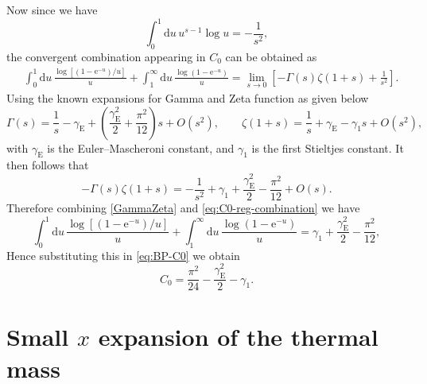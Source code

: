 \documentclass[a4paper,11pt]{article}
\newcommand{\e}{\mathrm e}
\newcommand{\dd}{\mathrm d}
\begin{document}
Now since we have
\begin{equation}
	\int_0^1\dd u\,u^{s-1}\log u
	=
	-\frac{1}{s^2},
\end{equation}
the convergent combination appearing in $C_0$ can be obtained as
\begin{align}
	&\int_0^1\dd u\,
	\frac{\log[(1-\e^{-u})/u]}{u}
	+
	\int_1^\infty\dd u\,
	\frac{\log(1-\e^{-u})}{u}
=
	\lim_{s\to0}
	\left[
	-\Gamma(s)\zeta(1+s)+\frac{1}{s^2}
	\right].
	\label{eq:C0-reg-combination}
\end{align}
Using the known expansions for Gamma and Zeta function as given below
\begin{equation}
	\Gamma(s)
	=
	\frac1s-\gamma_{\mathrm E}
	+\left(
	\frac{\gamma_{\mathrm E}^2}{2}
	+\frac{\pi^2}{12}
	\right)s+O(s^2),
	\qquad
	\zeta(1+s)
	=
	\frac1s+\gamma_{\mathrm E}
	-\gamma_1 s+O(s^2),
\end{equation}
with $\gamma_{\mathrm E}$ is the Euler--Mascheroni constant, and
$\gamma_1$ is the first Stieltjes constant.
It then follows that
\begin{equation}\label{GammaZeta}
	-\Gamma(s)\zeta(1+s)
	=
	-\frac1{s^2}
	+\gamma_1
	+\frac{\gamma_{\mathrm E}^2}{2}
	-\frac{\pi^2}{12}
	+O(s).
\end{equation}
Therefore combining \eqref{GammaZeta} and \eqref{eq:C0-reg-combination} we have
\begin{equation}
	\int_0^1\dd u\,
	\frac{\log[(1-\e^{-u})/u]}{u}
	+
	\int_1^\infty\dd u\,
	\frac{\log(1-\e^{-u})}{u}
	=
	\gamma_1+\frac{\gamma_{\mathrm E}^2}{2}
	-\frac{\pi^2}{12},
\end{equation}
Hence substituting this in \eqref{eq:BP-C0} we obtain
\begin{equation}
	C_0
	=
	\frac{\pi^2}{24}
	-\frac{\gamma_{\mathrm E}^2}{2}
	-\gamma_1.
	\label{eq:BP-C0-closed}
\end{equation}
\section{Small {$x$} expansion of the thermal mass}
\label{app:thermal-mass-orders}
\end{document}
